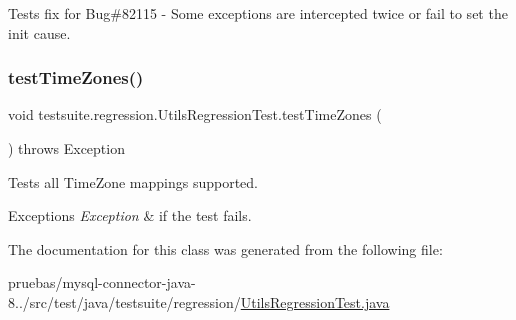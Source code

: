 Tests fix for Bug\#82115 -\/ Some exceptions are intercepted twice or fail to set the init cause. \mbox{\label{classtestsuite_1_1regression_1_1_utils_regression_test_a23afa0e1c5288ab757fb3e4c09676f79}} 
\subsubsection{\texorpdfstring{test\+Time\+Zones()}{testTimeZones()}}
{\footnotesize\ttfamily void testsuite.\+regression.\+Utils\+Regression\+Test.\+test\+Time\+Zones (\begin{DoxyParamCaption}{ }\end{DoxyParamCaption}) throws Exception}

Tests all Time\+Zone mappings supported.


\begin{DoxyExceptions}{Exceptions}
{\em Exception} & if the test fails. \\
\hline
\end{DoxyExceptions}


The documentation for this class was generated from the following file\+:\begin{DoxyCompactItemize}
\item 
pruebas/mysql-\/connector-\/java-\/8../src/test/java/testsuite/regression/\mbox{\hyperlink{_utils_regression_test_8java}{Utils\+Regression\+Test.\+java}}\end{DoxyCompactItemize}
